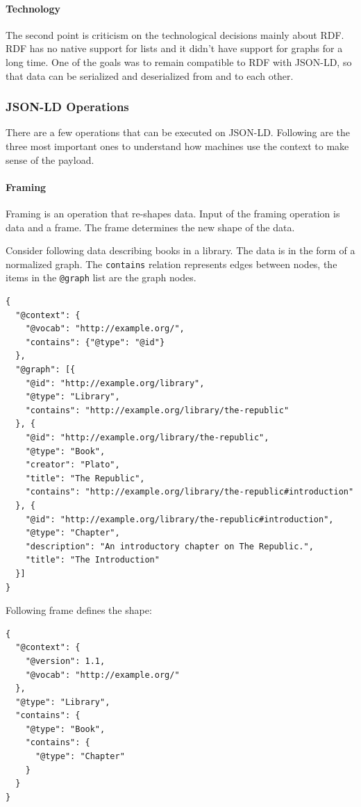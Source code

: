 \paragraph{Technology}
The second point is criticism on the technological decisions mainly about RDF. RDF has no native support for lists and it didn't have support for graphs for a long time. One of the goals was to remain compatible to RDF with JSON-LD, so that data can be serialized and deserialized from and to each other. \citep{semanticwebrevisited}

\subsubsection{JSON-LD Operations}
There are a few operations that can be executed on JSON-LD. Following are the three most important ones to understand how machines use the context to make sense of the payload.

\paragraph{Framing}
Framing is an operation that re-shapes data. Input of the framing operation is data and a frame. The frame determines the new shape of the data.

Consider following data describing books in a library. The data is in the form of a normalized graph. The \lstinline{contains} relation represents edges between nodes, the items in the \lstinline{@graph} list are the graph nodes.

\lstset{language=JSON}
\begin{lstlisting}[caption=Data of a library as normalized graph]
{
  "@context": {
    "@vocab": "http://example.org/",
    "contains": {"@type": "@id"}
  },
  "@graph": [{
    "@id": "http://example.org/library",
    "@type": "Library",
    "contains": "http://example.org/library/the-republic"
  }, {
    "@id": "http://example.org/library/the-republic",
    "@type": "Book",
    "creator": "Plato",
    "title": "The Republic",
    "contains": "http://example.org/library/the-republic#introduction"
  }, {
    "@id": "http://example.org/library/the-republic#introduction",
    "@type": "Chapter",
    "description": "An introductory chapter on The Republic.",
    "title": "The Introduction"
  }]
}
\end{lstlisting}

Following frame defines the shape:

\lstset{language=JSON}
\begin{lstlisting}[caption=Frame for the framing operation]
{
  "@context": {
    "@version": 1.1,
    "@vocab": "http://example.org/"
  },
  "@type": "Library",
  "contains": {
    "@type": "Book",
    "contains": {
      "@type": "Chapter"
    }
  }
}
\end{lstlisting}


